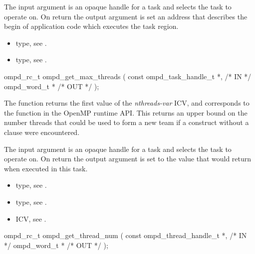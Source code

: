 \argdesc
The input argument  is an opaque handle for a task and selects the task to operate on.
On return the output argument  is set an address that describes the begin of application
code which executes the task region.

\crossreferences
\begin{itemize}
	\item {} type, see .
	\item {} type, see .
\end{itemize}


\summary

\format
\cspecificstart
\begin{boxedcode}
ompd\_rc\_t ompd\_get\_max\_threads (
  const ompd\_task\_handle\_t  *,                           /* IN */
  ompd\_word\_t              *                                   /* OUT */
); 
\end{boxedcode}
\cspecificend

\descr
The  function returns the first value of the
 \emph{nthreads-var} ICV,
and corresponds to the  function
in the OpenMP runtime API.
This returns an upper bound on the number threads that could be used
to form a new team if a  construct without a
 clause were encountered.

\argdesc
The input argument  is an opaque handle for a task and selects the task to operate on.
On return the output argument  is set to the value that  would return when
executed in this task.

\crossreferences
\begin{itemize}
	\item {} type, see .
	\item {} type, see .
	\item {} ICV, see .
\end{itemize}

\summary

\format
\cspecificstart
\begin{boxedcode}
ompd\_rc\_t ompd\_get\_thread\_num (
  const ompd\_thread\_handle\_t *,                       /* IN */
  ompd\_word\_t *                                 /* OUT */
);
\end{boxedcode}
\cspecificend

